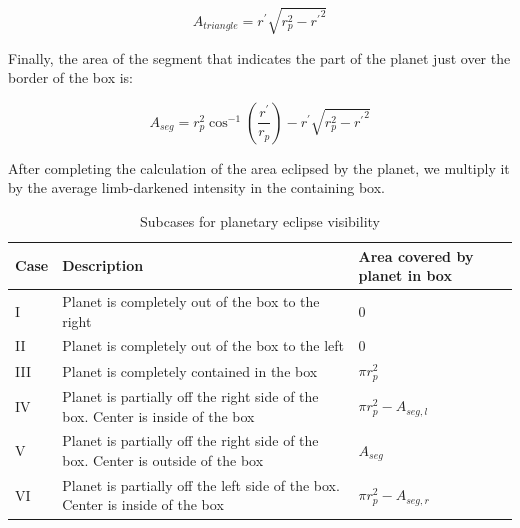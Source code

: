 \begin{equation}
	A_{triangle} = r^{\prime}\sqrt{r_p^2 - {r^{\prime}}^2}
\end{equation}

Finally, the area of the segment that indicates the part of the planet just over the border of the box is:

\begin{equation}
	A_{seg} = r_p^2 \cos^{-1}\left(\frac{r^{\prime}}{r_p}\right) - r^{\prime} \sqrt{r_p^2 - {r^{\prime}}^2}
\end{equation}

After completing the calculation of the area eclipsed by the planet, we multiply it by the average limb-darkened intensity in the containing box.


\begin{table}
	\caption{Subcases for planetary eclipse visibility}
	\label{cases}
	\begin{center}
	\renewcommand{\arraystretch}{1.2}
		\begin{tabular}{| m{} | m{} | m{} |} %
			\hline
			\textbf{Case}    & \textbf{Description} & \textbf{Area covered by planet in box}\\ %
			\hline%
			I      &   Planet is completely out of the box to the right                                                                      & 0                                                           \\ \hline
			II     &   Planet is completely out of the box to the left                                                                         & 0                                                           \\ \hline
			III    &   Planet is completely contained in the box                                                                              & $\pi r_p^2$                                         \\ \hline
			IV    &   Planet is partially off the right side of the box. Center is inside of the box                       & $\pi r_p^2 - A_{seg,l}$                     \\ \hline
			V     &   Planet is partially off the right side of the box. Center is outside of the box                     & $A_{seg}$                                          \\ \hline
			VI    &   Planet is partially off the left side of the box. Center is inside of the box                          & $\pi r_p^2 - A_{seg,r}$                     \\ \hline

\end{tabular}
\end{center}
\end{table}
